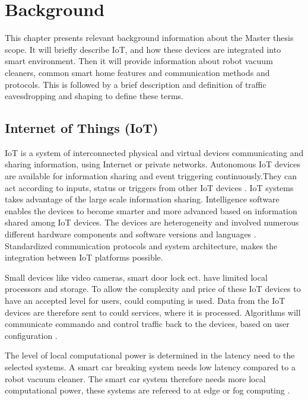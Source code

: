 \chapter{Background}
This chapter presents relevant background information about the Master thesis scope. It will briefly describe IoT, and how these devices are integrated into smart environment. Then it will provide information about robot vacuum cleaners, common smart home features and communication methods and protocols. This is followed by a brief description and definition of traffic eavesdropping and shaping to define these terms. 

\section{Internet of Things (IoT)}
IoT is a system of interconnected physical and virtual devices communicating and sharing information, using Internet or private networks. Autonomous IoT devices are available for information sharing and event triggering continuously.They can act according to inputs, status or triggers from other IoT devices \cite{atlam2020iot}. IoT systems takes advantage of the large scale information sharing. Intelligence software enables the devices to become smarter and more advanced based on information shared among IoT devices. The devices are heterogeneity and involved numerous different hardware components and software versions and languages \cite{atlam2020iot}. Standardized communication protocols and system architecture, makes the integration between IoT platforms possible. 

Small devices like video cameras, smart door lock ect. have limited local processors and storage. To allow the complexity and price of these IoT devices to have an accepted level for users, could computing is used. Data from the IoT devices are therefore sent to could services, where it is processed. Algorithms will communicate commando and control traffic back to the devices, based on user configuration \cite{pavelic2018internet}. 

The level of local computational power is determined in the latency need to the selected systems. A smart car breaking system needs low latency compared to a robot vacuum cleaner. The smart car system therefore needs more local computational power, these systems are refereed to at edge or fog computing \cite{mocrii2018iot}.  


